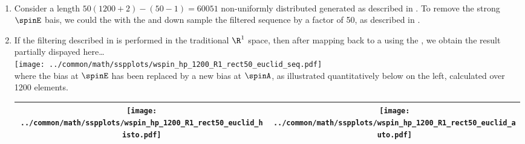 \begin{example}
\label{ex:spin_rhp}
\mbox{}\\
\begin{enumerate}
  \item \label{item:wspin_hp_seq} \label{item:wspin_hp_rect50}
    Consider a length $50(1200+2)-(50-1)=60051$  non-uniformly distributed  
    generated as described in .
    To remove the strong $\spinE$ bais, we could  the  with 
    the  %
    and down sample the filtered sequence by a factor of 50, as described in .

  \item \label{item:wspin_hp_rect50_R1}
        If the filtering described in  is performed in the traditional $\R^1$ space,
        then after mapping back to a 
        using the ,
        we obtain the result partially dispayed here\ldots
          \\\texttt{[image: ../common/math/sspplots/wspin\_hp\_1200\_R1\_rect50\_euclid\_seq.pdf]}\\
        where the bias at $\spinE$ has been replaced by a new bias at $\spinA$, 
        as illustrated quantitatively below on the left, 
        calculated over 1200 elements. %
          \\\begin{tabular}{|>{\scs}c|>{\scs}c|}
               \hline
               \texttt{[image: ../common/math/sspplots/wspin\_hp\_1200\_R1\_rect50\_euclid\_histo.pdf]}
              &\texttt{[image: ../common/math/sspplots/wspin\_hp\_1200\_R1\_rect50\_euclid\_auto.pdf]}
             \\\hline
          \end{tabular}



\end{enumerate}
\end{example}
